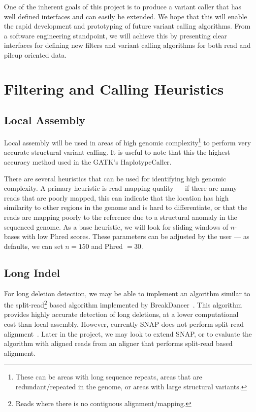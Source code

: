 \documentclass[11pt]{article}
\begin{document}
One of the inherent goals of this project is to produce a variant caller that has well defined interfaces and can easily be
extended. We hope that this will enable the rapid development and prototyping of future variant calling algorithms. From
a software engineering standpoint, we will achieve this by presenting clear interfaces for defining new filters and variant
calling algorithms for both read and pileup oriented data.

\section{Filtering and Calling Heuristics}
\label{sec:filtering-calling}

\subsection{Local Assembly}
\label{sec:local-assembly}

Local assembly will be used in areas of high genomic complexity\footnote{These can be areas with long sequence
repeats, areas that are redundant/repeated in the genome, or areas with large structural variants.} to perform very accurate
structural variant calling. It is useful to note that this the highest accuracy method used in the GATK's HaplotypeCaller.

There are several heuristics that can be used for identifying high genomic complexity. A primary heuristic is read mapping
quality --- if there are many reads that are poorly mapped, this can indicate that the location has high similarity to other
regions in the genome and is hard to differentiate, or that the reads are mapping poorly to the reference due to a structural
anomaly in the sequenced genome. As a base heuristic, we will look for sliding windows of $n$-bases with low Phred scores.
These parameters can be adjusted by the user --- as defaults, we can set $n = 150$ and Phred $= 30$.

\subsection{Long Indel}
\label{sec:long-indel}

For long deletion detection, we may be able to implement an algorithm similar to the split-read\footnote{Reads where
there is no contiguous alignment/mapping.} based algorithm implemented by BreakDancer~\cite{chen09}. This
algorithm provides highly accurate detection of long deletions, at a lower computational cost than local assembly.
However, currently SNAP does not perform split-read alignment~\cite{zaharia11}. Later in the project, we may
look to extend SNAP, or to evaluate the algorithm with aligned reads from an aligner that performs split-read based
alignment.
\end{document}
